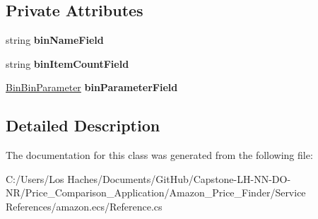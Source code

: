 \subsection*{Private Attributes}
\begin{DoxyCompactItemize}
\item 
\hypertarget{class_price___comparison_1_1amazon_1_1ecs_1_1_bin_ad0b106d20fff9156b17d922727d23f6a}{string {\bfseries bin\-Name\-Field}}\label{class_price___comparison_1_1amazon_1_1ecs_1_1_bin_ad0b106d20fff9156b17d922727d23f6a}

\item 
\hypertarget{class_price___comparison_1_1amazon_1_1ecs_1_1_bin_a374ea82b4bdda22b343eb0bc397f5e5b}{string {\bfseries bin\-Item\-Count\-Field}}\label{class_price___comparison_1_1amazon_1_1ecs_1_1_bin_a374ea82b4bdda22b343eb0bc397f5e5b}

\item 
\hypertarget{class_price___comparison_1_1amazon_1_1ecs_1_1_bin_a9afcd8b27135c9e8a565e235399681ac}{\hyperlink{class_price___comparison_1_1amazon_1_1ecs_1_1_bin_bin_parameter}{Bin\-Bin\-Parameter} {\bfseries bin\-Parameter\-Field}}\label{class_price___comparison_1_1amazon_1_1ecs_1_1_bin_a9afcd8b27135c9e8a565e235399681ac}

\end{DoxyCompactItemize}


\subsection{Detailed Description}


The documentation for this class was generated from the following file\-:\begin{DoxyCompactItemize}
\item 
C\-:/\-Users/\-Los Haches/\-Documents/\-Git\-Hub/\-Capstone-\/\-L\-H-\/\-N\-N-\/\-D\-O-\/\-N\-R/\-Price\-\_\-\-Comparison\-\_\-\-Application/\-Amazon\-\_\-\-Price\-\_\-\-Finder/\-Service References/amazon.\-ecs/Reference.\-cs\end{DoxyCompactItemize}
